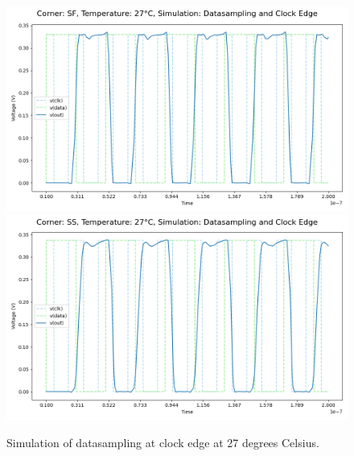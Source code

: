 \begin{figure}[H]
    \vspace{5pt}
    \includegraphics[height= 0.21\textheight]{figures/aimspice/SF/27/W1.csv.png}
    \vspace{5pt}
    \includegraphics[height= 0.21\textheight]{figures/aimspice/SS/27/W1.csv.png}
    \caption{Simulation of datasampling at clock edge at 27 degrees Celsius.}
    \label{fig:aimspice_W1_27}
\end{figure}

\pagebreak

